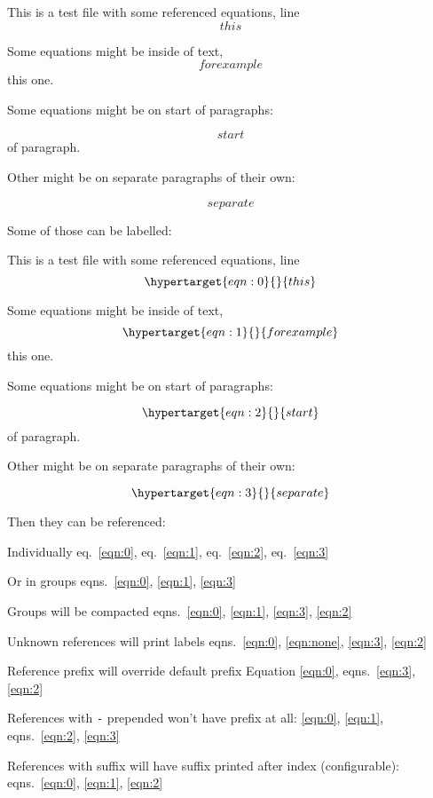 This is a test file with some referenced equations, line \[ this \]

Some equations might be inside of text, \[ for example \] this one.

Some equations might be on start of paragraphs:

\[ start \] of paragraph.

Other might be on separate paragraphs of their own:

\[ separate \]

Some of those can be labelled:

This is a test file with some referenced equations, line
\begin{equation}\protect\hypertarget{eqn:0}{}{ this }\label{eqn:0}\end{equation}

Some equations might be inside of text,
\begin{equation}\protect\hypertarget{eqn:1}{}{ for example }\label{eqn:1}\end{equation}
this one.

Some equations might be on start of paragraphs:

\begin{equation}\protect\hypertarget{eqn:2}{}{ start }\label{eqn:2}\end{equation}
of paragraph.

Other might be on separate paragraphs of their own:

\begin{equation}\protect\hypertarget{eqn:3}{}{ separate }\label{eqn:3}\end{equation}

Then they can be referenced:

Individually eq.~\ref{eqn:0}, eq.~\ref{eqn:1}, eq.~\ref{eqn:2},
eq.~\ref{eqn:3}

Or in groups eqns.~\ref{eqn:0}, \ref{eqn:1}, \ref{eqn:3}

Groups will be compacted
eqns.~\ref{eqn:0}, \ref{eqn:1}, \ref{eqn:3}, \ref{eqn:2}

Unknown references will print labels
eqns.~\ref{eqn:0}, \ref{eqn:none}, \ref{eqn:3}, \ref{eqn:2}

Reference prefix will override default prefix Equation \ref{eqn:0},
eqns.~\ref{eqn:3}, \ref{eqn:2}

References with \texttt{-} prepended won't have prefix at all:
\ref{eqn:0}, \ref{eqn:1}, eqns.~\ref{eqn:2}, \ref{eqn:3}

References with suffix will have suffix printed after index
(configurable): eqns.~\ref{eqn:0}, \ref{eqn:1}, \ref{eqn:2}
